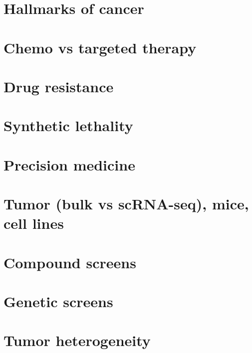 \documentclass[
]{book}
\begin{document}
\hypertarget{hallmarks-of-cancer}{%
\section{Hallmarks of cancer}\label{hallmarks-of-cancer}}

\hypertarget{chemo-vs-targeted-therapy}{%
\section{Chemo vs targeted therapy}\label{chemo-vs-targeted-therapy}}

\hypertarget{drug-resistance}{%
\section{Drug resistance}\label{drug-resistance}}

\hypertarget{synthetic-lethality}{%
\section{Synthetic lethality}\label{synthetic-lethality}}

\hypertarget{precision-medicine}{%
\section{Precision medicine}\label{precision-medicine}}

\hypertarget{tumor-bulk-vs-scrna-seq-mice-cell-lines}{%
\section{Tumor (bulk vs scRNA-seq), mice, cell lines}\label{tumor-bulk-vs-scrna-seq-mice-cell-lines}}

\hypertarget{compound-screens}{%
\section{Compound screens}\label{compound-screens}}

\hypertarget{genetic-screens}{%
\section{Genetic screens}\label{genetic-screens}}

\hypertarget{tumor-heterogeneity}{%
\section{Tumor heterogeneity}\label{tumor-heterogeneity}}
\end{document}
